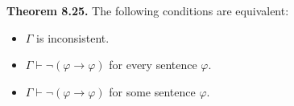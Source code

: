 \textbf{Theorem 8.25.} The following conditions are equivalent:

\begin{itemize}
  \item[(i)] $\Gamma$ is inconsistent.
  \item[(ii)] $\Gamma \vdash \neg(\varphi \rightarrow \varphi)$ for every sentence $\varphi$.
  \item[(iii)] $\Gamma \vdash \neg(\varphi \rightarrow \varphi)$ for some sentence $\varphi$.
\end{itemize}
